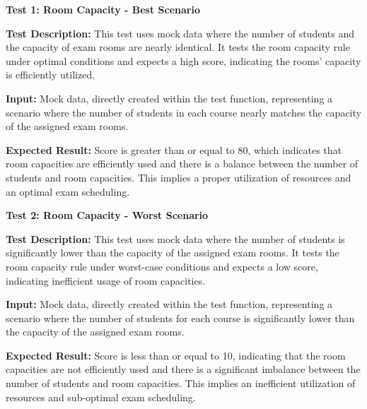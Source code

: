  
\vspace{\baselineskip}


 
 \textbf{Test 1: Room Capacity - Best Scenario}


\vspace{\baselineskip}

 
 \textbf{Test Description:}
This test uses mock data where the number of students and the capacity of
exam rooms are nearly identical. It tests the room capacity rule under optimal conditions and
expects a high score, indicating the rooms' capacity is efficiently utilized.

\vspace{\baselineskip}


 \textbf{Input:}
Mock data, directly created within the test function, representing a scenario where the
number of students in each course nearly matches the capacity of the assigned exam rooms.

\vspace{\baselineskip}

 
 \textbf{Expected Result:}
Score is greater than or equal to 80, which indicates that room capacities are
efficiently used and there is a balance between the number of students and room capacities. This
implies a proper utilization of resources and an optimal exam scheduling.

\vspace{\baselineskip}

 
 \textbf{Test 2: Room Capacity - Worst Scenario}


\vspace{\baselineskip}

 
 \textbf{Test Description:}
This test uses mock data where the number of students is significantly lower
than the capacity of the assigned exam rooms. It tests the room capacity rule under worst-case
conditions and expects a low score, indicating inefficient usage of room capacities.

\vspace{\baselineskip}


 \textbf{Input:}
Mock data, directly created within the test function, representing a scenario where the
number of students for each course is significantly lower than the capacity of the assigned exam
rooms.
 
\vspace{\baselineskip}

 
 \textbf{Expected Result:}
Score is less than or equal to 10, indicating that the room capacities are not
efficiently used and there is a significant imbalance between the number of students and room
capacities. This implies an inefficient utilization of resources and sub-optimal exam scheduling.


